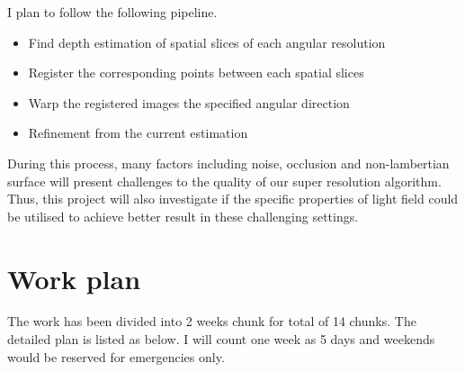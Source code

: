 \documentclass[11pt]{article}
\begin{document}
I plan to follow the following pipeline.

\begin{itemize}
  \item Find depth estimation of spatial slices of each angular resolution
  \item Register the corresponding points between each spatial slices
  \item Warp the registered images the specified angular direction
  \item Refinement from the current estimation
\end{itemize}

During this process, many factors including noise, occlusion and non-lambertian
surface will present challenges to the quality of our super resolution
algorithm. Thus, this project will also investigate if the specific properties
of light field could be utilised to achieve better result in these challenging
settings.

\section{Work plan}

The work has been divided into 2 weeks chunk for total of 14 chunks. The
detailed plan is listed as below. I will count one week as 5 days and weekends
would be reserved for emergencies only.
\end{document}
